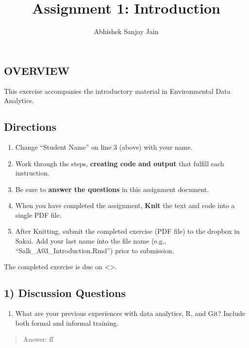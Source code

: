 \documentclass[
]{article}
\title{Assignment 1: Introduction}
\author{Abhishek Sanjay Jain}
\date{}
\providecommand{\tightlist}{%
  \setlength{\itemsep}{0pt}\setlength{\parskip}{0pt}}
\begin{document}
\maketitle

\hypertarget{overview}{%
\subsection{OVERVIEW}\label{overview}}

This exercise accompanies the introductory material in Environmental
Data Analytics.

\hypertarget{directions}{%
\subsection{Directions}\label{directions}}

\begin{enumerate}
\def\labelenumi{\arabic{enumi}.}
\tightlist
\item
  Change ``Student Name'' on line 3 (above) with your name.
\item
  Work through the steps, \textbf{creating code and output} that fulfill
  each instruction.
\item
  Be sure to \textbf{answer the questions} in this assignment document.
\item
  When you have completed the assignment, \textbf{Knit} the text and
  code into a single PDF file.
\item
  After Knitting, submit the completed exercise (PDF file) to the
  dropbox in Sakai. Add your last name into the file name (e.g.,
  ``Salk\_A03\_Introduction.Rmd'') prior to submission.
\end{enumerate}

The completed exercise is due on \textless\textgreater.

\hypertarget{discussion-questions}{%
\subsection{1) Discussion Questions}\label{discussion-questions}}

\begin{enumerate}
\def\labelenumi{\arabic{enumi}.}
\tightlist
\item
  What are your previous experiences with data analytics, R, and Git?
  Include both formal and informal training.
\end{enumerate}

\begin{quote}
Answer: ff
\end{quote}
\end{document}

